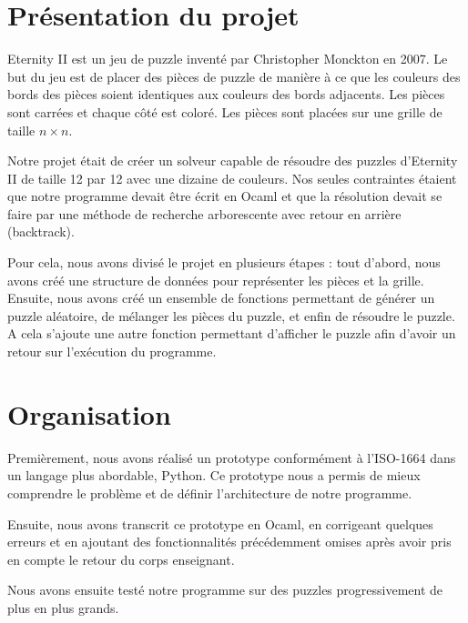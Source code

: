 \documentclass[french]{rapportAlgoM1}
\title{\LARGE{\titreGeneral}}%
\author{\auteurA \\ \auteurB}%
\date{2023-24}
\begin{document}
\setlength{\parindent}{1cm}%


\tableofcontents
\newpage

\section*{Présentation du projet}

Eternity II est un jeu de puzzle inventé par Christopher Monckton en
2007. Le but du jeu est de placer des pièces de puzzle de manière à
ce que les couleurs des bords des pièces soient identiques aux
couleurs des bords adjacents.  Les pièces sont carrées et chaque
côté est coloré. Les pièces sont placées sur une grille de taille
$n \times n$.

Notre projet était de créer un solveur capable de résoudre des
puzzles d’Eternity II de taille 12 par 12 avec une dizaine de
couleurs. Nos seules contraintes étaient que notre programme devait
être écrit en Ocaml et que la résolution devait se faire par une
méthode de recherche arborescente avec retour en arrière (backtrack).

Pour cela, nous avons divisé le projet en plusieurs étapes :
tout d’abord, nous avons créé une structure de données pour
représenter les pièces et la grille. Ensuite, nous avons créé un
ensemble de fonctions permettant de générer un puzzle aléatoire,
de mélanger les pièces du puzzle, et enfin de résoudre le puzzle.
A cela s’ajoute une autre fonction permettant d'afficher le puzzle
afin d'avoir un retour sur l'exécution du programme.

\section*{Organisation}

Premièrement, nous avons réalisé un prototype conformément à
l'ISO-1664 dans un langage plus abordable, Python. Ce prototype
nous a permis de mieux comprendre le problème et de définir
l'architecture de notre programme.

Ensuite, nous avons transcrit ce prototype en Ocaml, en corrigeant
quelques erreurs et en ajoutant des fonctionnalités précédemment
omises après avoir pris en compte le retour du corps enseignant.

Nous avons ensuite testé notre programme sur des puzzles
progressivement de plus en plus grands.
\end{document}
